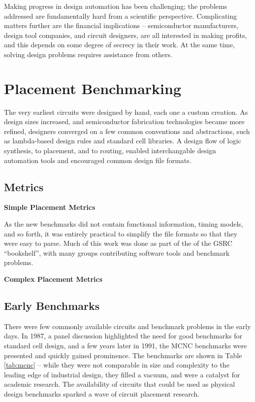\documentclass[sigconf]{acmart}
\begin{document}
Making progress in design automation has been challenging;
the problems addressed are fundamentally hard from a scientific
perspective. Complicating matters further are the financial
implications -- semiconductor manufacturers, design tool companies,
and circuit designers, are all interested in making profits, and
this depends on some degree of secrecy in their work.  At the
same time, solving design problems requires assistance from
others.
\fi


\section{Placement Benchmarking}

The very earliest circuits were designed by hand, each one a custom
creation. As design sizes increased, and semiconductor fabrication
technologies became more refined, designers converged on a few
common conventions and abstractions, such as lambda-based design rules
and standard cell libraries\cite{Mead93}.  A design flow of logic
synthesis, to placement, and to routing, enabled interchangable
design automation tools and encouraged common design file formats.



\subsection{Metrics}
{\bf Simple Placement Metrics}

As the new benchmarks did not contain functional information,
timing models, and so forth, it was entirely practical to
simplify the file formats so that they were easy to parse.
Much of this work was done as part of the of the
GSRC ``bookshelf''\cite{umichbookshelf}, with many groups
contributing software tools and benchmark problems.

{\bf Complex Placement Metrics}



\subsection{Early Benchmarks}


There were few commonly available circuits and benchmark problems in
the early days.  In 1987, a panel discussion\cite{Preas87} highlighted
the need for good benchmarks for standard cell design, and a few years
later in 1991, the MCNC benchmarks\cite{Kozminski91} were presented
and quickly gained prominence.  The benchmarks are shown in Table
\ref{tab:mcnc} -- while they were not comparable in size and
complexity to the leading edge of industrial design, they filled a
vacuum, and were a catalyst for academic research.  The availability
of circuits that could be used as physical design benchmarks sparked a
wave of circuit placement research.
\end{document}
